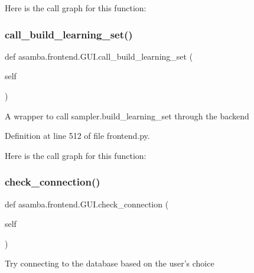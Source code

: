 Here is the call graph for this function\+:
\mbox{\label{classasamba_1_1frontend_1_1_g_u_i_a118685a11c1f7602c17c22bc35419ef2}} 
\subsubsection{\texorpdfstring{call\+\_\+build\+\_\+learning\+\_\+set()}{call\_build\_learning\_set()}}
{\footnotesize\ttfamily def asamba.\+frontend.\+G\+U\+I.\+call\+\_\+build\+\_\+learning\+\_\+set (\begin{DoxyParamCaption}\item[{}]{self }\end{DoxyParamCaption})}

\begin{DoxyVerb}A wrapper to call sampler.build_learning_set through the backend \end{DoxyVerb}
 

Definition at line 512 of file frontend.\+py.

Here is the call graph for this function\+:
\mbox{\label{classasamba_1_1frontend_1_1_g_u_i_aacca71c626bd1753c1277e13b5ad8eec}} 
\subsubsection{\texorpdfstring{check\+\_\+connection()}{check\_connection()}}
{\footnotesize\ttfamily def asamba.\+frontend.\+G\+U\+I.\+check\+\_\+connection (\begin{DoxyParamCaption}\item[{}]{self }\end{DoxyParamCaption})}

\begin{DoxyVerb}Try connecting to the database based on the user's choice \end{DoxyVerb}
 

